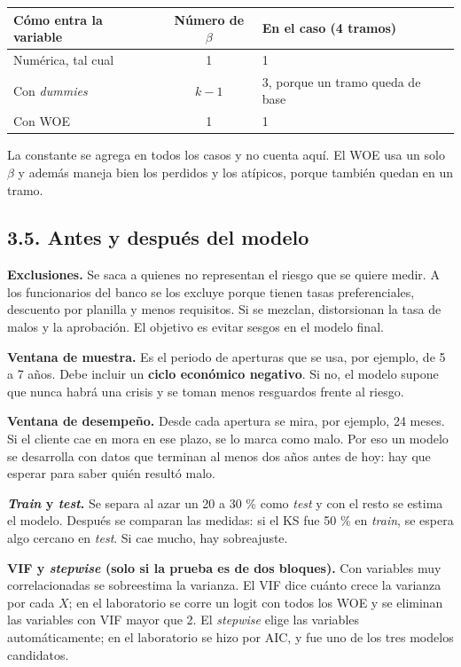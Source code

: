 \documentclass[11pt,letterpaper]{article}
\newcommand{\tema}[1]{\subsection*{#1}}
\begin{document}
\begin{center}
\begin{tabular}{lcl}
\toprule
\textbf{Cómo entra la variable} & \textbf{Número de $\beta$} & \textbf{En el caso (4 tramos)} \\
\midrule
Numérica, tal cual & 1 & 1 \\
Con \emph{dummies} & $k-1$ & 3, porque un tramo queda de base \\
Con WOE & 1 & 1 \\
\bottomrule
\end{tabular}
\end{center}

La constante se agrega en todos los casos y no cuenta aquí. El WOE usa un solo $\beta$ y además maneja bien los perdidos y los atípicos, porque también quedan en un tramo.

\tema{3.5. Antes y después del modelo}

\textbf{Exclusiones.} Se saca a quienes no representan el riesgo que se quiere medir. A los funcionarios del banco se los excluye porque tienen tasas preferenciales, descuento por planilla y menos requisitos. Si se mezclan, distorsionan la tasa de malos y la aprobación. El objetivo es evitar sesgos en el modelo final.

\textbf{Ventana de muestra.} Es el periodo de aperturas que se usa, por ejemplo, de 5 a 7 años. Debe incluir un \textbf{ciclo económico negativo}. Si no, el modelo supone que nunca habrá una crisis y se toman menos resguardos frente al riesgo.

\textbf{Ventana de desempeño.} Desde cada apertura se mira, por ejemplo, 24 meses. Si el cliente cae en mora en ese plazo, se lo marca como malo. Por eso un modelo se desarrolla con datos que terminan al menos dos años antes de hoy: hay que esperar para saber quién resultó malo.

\textbf{\emph{Train} y \emph{test}.} Se separa al azar un 20 a 30 \% como \emph{test} y con el resto se estima el modelo. Después se comparan las medidas: si el KS fue 50 \% en \emph{train}, se espera algo cercano en \emph{test}. Si cae mucho, hay sobreajuste.

\textbf{VIF y \emph{stepwise} (solo si la prueba es de dos bloques).} Con variables muy correlacionadas se sobreestima la varianza. El VIF dice cuánto crece la varianza por cada $X$; en el laboratorio se corre un logit con todos los WOE y se eliminan las variables con VIF mayor que 2. El \emph{stepwise} elige las variables automáticamente; en el laboratorio se hizo por AIC, y fue uno de los tres modelos candidatos.
\end{document}
